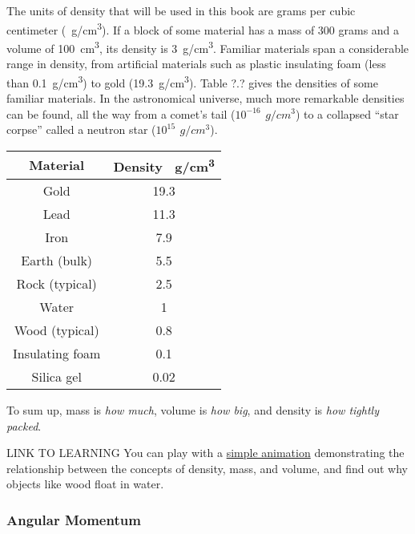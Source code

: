 \documentclass[main-astronomy.tex]{subfiles}
\begin{document}
\vspace{1em}

The units of density that will be used in this book are grams per cubic centimeter (\SI{}{g/cm^3}). If a block of some material has a mass of 300 grams and a volume of \SI{100}{cm^3}, its density is \SI{3}{g/cm^3}. Familiar materials span a considerable range in density, from artificial materials such as plastic insulating foam (less than \SI{0.1}{g/cm^3}) to gold (\SI{19.3}{g/cm^3}). Table ?.? gives the densities of some familiar materials. In the astronomical universe, much more remarkable densities can be found, all the way from a comet’s tail ($10^{-16}\,\SI{}{g/cm^3}$) to a collapsed ``star corpse'' called a neutron star ($10^{15}\,\SI{}{g/cm^3}$).

\begin{center}
    \begin{tabular}{|c|c|}
    \hline
        \textbf{Material} & \textbf{Density \SI{}{g/cm^3}} \\
        \hline
        Gold & 19.3\\
        Lead & 11.3\\
        Iron & 7.9\\
        Earth (bulk) & 5.5\\
        Rock (typical) & 2.5\\
        Water & 1\\
        Wood (typical) & 0.8\\
        Insulating foam & 0.1\\
        Silica gel & 0.02\\
        \hline
    \end{tabular}
    \captionsetup{type=table,margin=1in,font=scriptsize}
\end{center}

To sum up, mass is \textit{how much}, volume is \textit{how big}, and density is \textit{how tightly packed}.

\begin{gradient}{LINK TO LEARNING}
    You can play with a \href{https://openstax.org/l/30phetsimdenmas}{simple animation} demonstrating the relationship between the concepts of density, mass, and volume, and find out why objects like wood float in water.
\end{gradient}

\subsubsection*{Angular Momentum}
\end{document}
